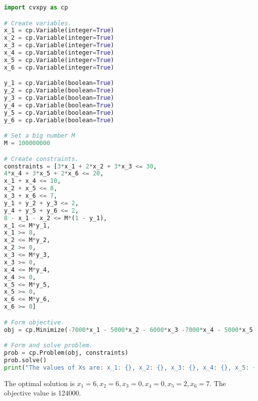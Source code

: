 \documentclass[12pt,letterpaper]{article}
\begin{document}
\begin{lstlisting}[language=Python, caption=Question 2.b]
import cvxpy as cp

# Create variables.
x_1 = cp.Variable(integer=True)
x_2 = cp.Variable(integer=True)
x_3 = cp.Variable(integer=True)
x_4 = cp.Variable(integer=True)
x_5 = cp.Variable(integer=True)
x_6 = cp.Variable(integer=True)

y_1 = cp.Variable(boolean=True)
y_2 = cp.Variable(boolean=True)
y_3 = cp.Variable(boolean=True)
y_4 = cp.Variable(boolean=True)
y_5 = cp.Variable(boolean=True)
y_6 = cp.Variable(boolean=True)

# Set a big number M
M = 100000000

# Create constraints.
constraints = [3*x_1 + 2*x_2 + 3*x_3 <= 30,
4*x_4 + 3*x_5 + 2*x_6 <= 20, 
x_1 + x_4 <= 10, 
x_2 + x_5 <= 8, 
x_3 + x_6 <= 7,
y_1 + y_2 + y_3 <= 2, 
y_4 + y_5 + y_6 <= 2, 
8 - x_1 - x_2 <= M*(1 - y_1), 
x_1 <= M*y_1,
x_1 >= 0,
x_2 <= M*y_2,
x_2 >= 0,
x_3 <= M*y_3,
x_3 >= 0,
x_4 <= M*y_4,
x_4 >= 0,
x_5 <= M*y_5,
x_5 >= 0,
x_6 <= M*y_6, 
x_6 >= 0]

# Form objective.
obj = cp.Minimize(-7000*x_1 - 5000*x_2 - 6000*x_3 -7000*x_4 - 5000*x_5 - 6000*x_6 )

# Form and solve problem.
prob = cp.Problem(obj, constraints)
prob.solve()
print("The values of Xs are: x_1: {}, x_2: {}, x_3: {}, x_4: {}, x_5: {}, x_6: {}".format(x_1.value, x_2.value, x_3.value, x_4.value, x_5.value, x_6.value))
\end{lstlisting}

The optimal solution is $x_1 = 6, x_2 = 6, x_3 = 0, x_4 = 0, x_5 = 2, x_6 = 7$. The objective value is 124000.
\end{document}
